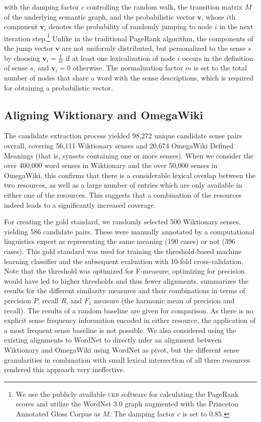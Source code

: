 \documentclass[output=paper]{LSP/langsci}
\begin{document}
 with the damping factor $c$ controlling the random walk, the transition matrix $M$ of the underlying semantic graph, and the probabilistic vector $\mathbf{v}$, whose $i\text{th}$ component $\mathbf{v}_i$ denotes the probability of randomly jumping to node $i$ in the next iteration step.\footnote{We use the publicly available \textsc{ukb} software  \citep{Agirre2009} for calculating the PageRank scores and utilize the WordNet 3.0 graph augmented with the Princeton Annotated Gloss Corpus as $M$. The damping factor $c$ is set to $0.85$.} Unlike in the traditional PageRank algorithm, the components of the jump vector $\mathbf{v}$ are not uniformly distributed, but personalized to the sense $s$ by choosing $\mathbf{v}_i = \frac{1}{m}$ if at least one lexicalization of node $i$ occurs in the definition of sense $s$, and $\mathbf{v}_i = 0$ otherwise. The normalization factor $m$ is set to the total number of nodes that share a word with the sense descriptions, which is required for obtaining a probabilistic vector.

\subsection{Aligning Wiktionary and OmegaWiki}
The candidate extraction process yielded 98,272 unique candidate sense pairs overall, covering 56,111 Wiktionary senses and 20,674 OmegaWiki Defined Meanings (that is, synsets containing one or more senses). 
When we consider the over 400,000 word senses in Wiktionary and the over 50,000 senses in OmegaWiki, this confirms that there is a considerable lexical overlap between the two resources, as well as a large number of entries which are  only  available in either one of the resources. This suggests that a combination of the resources indeed leads to a significantly increased coverage.
 
For creating the gold standard, we randomly selected 500 Wiktionary senses, yielding 586 candidate pairs. These were manually annotated by a computational linguistics expert as representing the same meaning (190 cases) or not (396 cases). This gold standard was used for training the threshold-based machine learning classifier and the subsequent evaluation with 10-fold cross-validation. Note that the threshold was optimized for F-measure; optimizing for precision would have led to higher thresholds and thus fewer alignments.  summarizes the results for the different similarity measures and their combinations in terms of precision $P$, recall $R$, and $F_1$ measure (the harmonic mean of precision and recall). The results of a random baseline are given for comparison. As there is no explicit sense frequency information encoded in either resource, the application of a most frequent sense baseline is not possible. We also considered using the existing alignments to WordNet to 
directly infer an alignment between Wiktionary and OmegaWiki using WordNet as pivot, but the different sense granularities in combination with small lexical intersection of all three resources rendered this approach very ineffective.  
\end{document}
